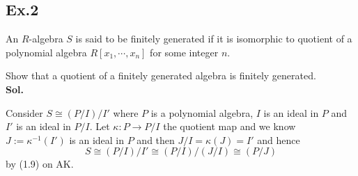 \documentclass[lang=en,11pt,a4paper,citestyle =authoryear]{elegantpaper}
\begin{document}
\subsection*{Ex.2} 
An $R$-algebra $S$ is said to be finitely generated if it is isomorphic to  quotient of a polynomial algebra $R[x_1,\cdots,x_n]$ for some integer $n$.\par
Show that a quotient of a finitely generated algebra is finitely generated.
\vspace{0.5em}\\
\textbf{Sol.} \par
Consider $S\cong (P/I)/I'$ where $P$ is a polynomial algebra, $I$ is an ideal in $P$ and $I'$ is an ideal in $P/I$. Let $\kappa: P\to P/I$ the quotient map and we know $J := \kappa^{-1}(I')$ is an ideal in $P$ and then $J/I = \kappa(J) = I'$ and hence
\[
S \cong (P/I)/I' \cong (P/I)/(J/I) \cong (P/J)
\]
by (1.9) on AK.
\par 
\vspace{0.5em}
\end{document}
